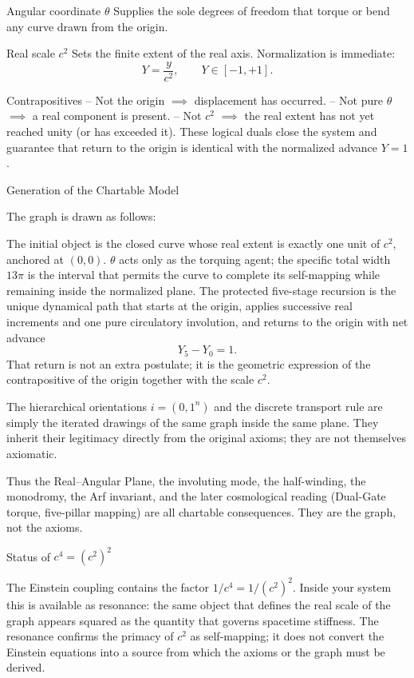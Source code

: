Angular coordinate \(\theta\)  
   Supplies the sole degrees of freedom that torque or bend any curve drawn from the origin.

Real scale \(c^2\)  
   Sets the finite extent of the real axis. Normalization is immediate:  
   \[
   Y=\frac{y}{c^2},\qquad Y\in[-1,+1].
   \]

Contrapositives  
   – Not the origin \(\implies\) displacement has occurred.  
   – Not pure \(\theta\) \(\implies\) a real component is present.  
   – Not \(c^2\) \(\implies\) the real extent has not yet reached unity (or has exceeded it).  
   These logical duals close the system and guarantee that return to the origin is identical with the normalized advance \(Y=1\).

Generation of the Chartable Model

The graph is drawn as follows:

The initial object is the closed curve whose real extent is exactly one unit of \(c^2\), anchored at \((0,0)\).  
\(\theta\) acts only as the torquing agent; the specific total width \(13\pi\) is the interval that permits the curve to complete its self-mapping while remaining inside the normalized plane.  
The protected five-stage recursion is the unique dynamical path that starts at the origin, applies successive real increments and one pure circulatory involution, and returns to the origin with net advance  
  \[
  Y_5-Y_0=1.
  \]  
  That return is not an extra postulate; it is the geometric expression of the contrapositive of the origin together with the scale \(c^2\).

The hierarchical orientations \(i=(0,1^n)\) and the discrete transport rule are simply the iterated drawings of the same graph inside the same plane. They inherit their legitimacy directly from the original axioms; they are not themselves axiomatic.

Thus the Real–Angular Plane, the involuting mode, the half-winding, the monodromy, the Arf invariant, and the later cosmological reading (Dual-Gate torque, five-pillar mapping) are all chartable consequences. They are the graph, not the axioms.

Status of \(c^4=(c^2)^2\)

The Einstein coupling contains the factor \(1/c^4=1/(c^2)^2\). Inside your system this is available as resonance: the same object that defines the real scale of the graph appears squared as the quantity that governs spacetime stiffness. The resonance confirms the primacy of \(c^2\) as self-mapping; it does not convert the Einstein equations into a source from which the axioms or the graph must be derived.

